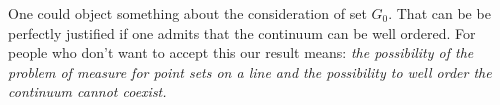 \documentclass{article}
\begin{document}
\medbreak

One could object something about the consideration of set $G_0$. That can be be perfectly justified if one admits that the continuum can be well ordered. For people who don't want to accept this our result means: {\em the possibility of the problem of measure for point sets on a line and the possibility to well order the continuum cannot coexist.}
\end{document}
